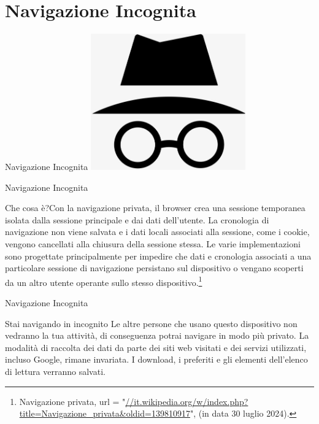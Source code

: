 \section{Navigazione Incognita}
\begin{frame}{Navigazione Incognita}
	\centering
	\includegraphics[width=0.50\textwidth]{navinc}
\end{frame}
\begin{frame}{Navigazione Incognita}
\begin{alertblock}{Che cosa è?}{Con la navigazione privata, il browser crea una sessione temporanea isolata dalla sessione principale e dai dati dell'utente. La cronologia di navigazione non viene salvata e i dati locali associati alla sessione, come i cookie, vengono cancellati alla chiusura della sessione stessa. Le varie implementazioni sono progettate principalmente per impedire che dati e cronologia associati a una particolare sessione di navigazione persistano sul dispositivo o vengano scoperti da un altro utente operante sullo stesso dispositivo.\footnote{Navigazione privata, url = "\url{//it.wikipedia.org/w/index.php?title=Navigazione_privata&oldid=139810917}", (in data 30 luglio 2024).}}
\end{alertblock}
\end{frame}
\begin{frame}{Navigazione Incognita}
	\begin{alertblock}{Stai navigando in incognito}{
			Le altre persone che usano questo dispositivo non vedranno la tua attività, di conseguenza potrai navigare in modo più privato. La modalità di raccolta dei dati da parte dei siti web visitati e dei servizi utilizzati, incluso Google, rimane invariata. I download, i preferiti e gli elementi dell'elenco di lettura verranno salvati. }
	\end{alertblock}
\end{frame}
